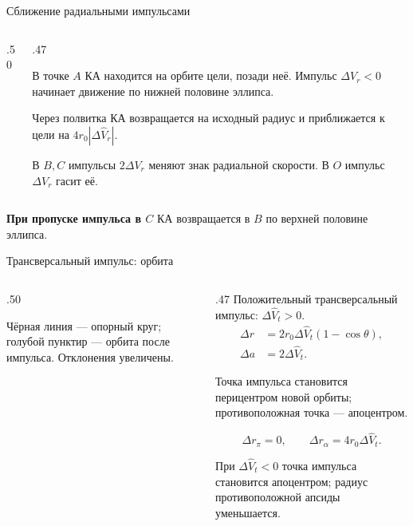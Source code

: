 \documentclass[11pt,aspectratio=169,t]{beamer}
\newcommand{\eqcompact}{\fontsize{10}{12}\selectfont}
\newcommand{\figcaption}[1]{{\usebeamerfont{caption}\color{coursemuted}#1\par}}
\begin{document}
\begin{frame}{Сближение радиальными импульсами}
\relax
\begin{columns}[T,onlytextwidth]
\begin{column}{.50\textwidth}
\centering
\end{column}
\begin{column}{.47\textwidth}
{\justifying
В точке $A$ КА находится на орбите цели, позади неё. Импульс $\Delta V_r<0$ начинает движение по нижней половине эллипса.\par}
\smallskip
Через полвитка КА возвращается на исходный радиус и приближается к цели на $4r_0|\Delta\widehat V_r|$.
\par\smallskip
{\justifying
В $B,C$ импульсы $2\Delta V_r$ меняют знак радиальной скорости. В $O$ импульс $\Delta V_r$ гасит её.\par}
\end{column}
\end{columns}
\smallskip
{\justifying
\textbf{При пропуске импульса в $C$} КА возвращается в $B$ по верхней половине эллипса.\par}
\end{frame}

\begin{frame}{Трансверсальный импульс: орбита}
\relax
\begin{columns}[T,onlytextwidth]
\begin{column}{.50\textwidth}
\centering
\figcaption{Чёрная линия --- опорный круг; голубой пунктир --- орбита после импульса. Отклонения увеличены.}
\end{column}
\begin{column}{.47\textwidth}
Положительный трансверсальный импульс: $\Delta\widehat V_t>0$.
{\eqcompact
\setlength{\abovedisplayskip}{3pt}\setlength{\belowdisplayskip}{3pt}
\setlength{\abovedisplayshortskip}{2pt}\setlength{\belowdisplayshortskip}{2pt}
\[
 \begin{aligned}
 \Delta r&=2r_0{\Delta\widehat V_t}(1-\cos\theta),\\
 \Delta a&=2{\Delta\widehat V_t}.
 \end{aligned}
\]
}
{\justifying
Точка импульса становится перицентром новой орбиты; противоположная точка --- апоцентром.\par}
{\eqcompact
\setlength{\abovedisplayskip}{3pt}\setlength{\belowdisplayskip}{3pt}
\setlength{\abovedisplayshortskip}{2pt}\setlength{\belowdisplayshortskip}{2pt}
\[
 \Delta r_\pi=0,\qquad \Delta r_\alpha=4r_0{\Delta\widehat V_t}.
\]
}
{\justifying
При ${\Delta\widehat V_t}<0$ точка импульса становится апоцентром; радиус противоположной апсиды уменьшается.\par}
\end{column}
\end{columns}
\end{frame}
\end{document}
